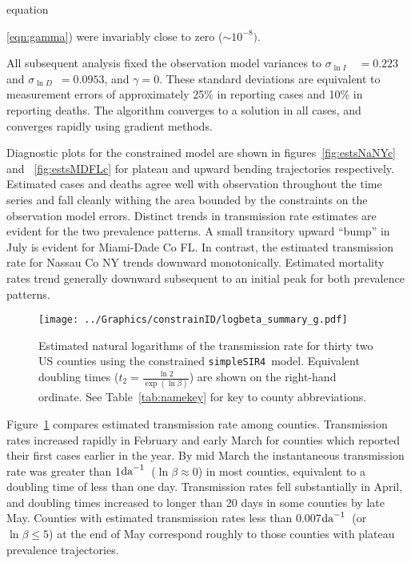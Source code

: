 \documentclass[12pt,letterpaper]{article}
\newcommand\perda{$\rm{da}^{-1}$}
\newcommand\SSm{{\tt simpleSIR4}}
\newcommand\slI{$\sigma_{\ln I}$\ }
\newcommand\slD{$\sigma_{\ln D}$}
\begin{document}
equation~{\ref{eqn:gamma}) were invariably close to 
zero ($\sim 10^{-8})$.

All subsequent analysis fixed the observation model variances to
\slI~$ = 0.223$ and \slD~$= 0.0953$, and $\gamma = 0$.
These standard deviations are equivalent to measurement errors of
approximately 25\% in reporting cases and 10\% in reporting deaths.
The algorithm converges to a solution in all cases, and converges
rapidly using gradient methods.

Diagnostic plots for the constrained model are shown in
figures~\ref{fig:estsNaNYc} and~ \ref{fig:estsMDFLc}
for plateau and upward  bending trajectories respectively.
Estimated cases and deaths agree well with observation throughout the
time series and fall cleanly withing the area bounded by the
constraints on the observation model errors.
Distinct trends in transmission rate estimates are evident for
the two prevalence patterns. A small transitory upward ``bump'' in July is
evident for Miami-Dade Co FL.
In contrast, the estimated transmission rate for Nassau Co NY trends
downward monotonically. 
Estimated mortality rates trend generally downward subsequent to an
initial peak for both prevalence patterns.

\begin{figure}[!h]
\begin{center}
\texttt{[image: ../Graphics/constrainID/logbeta\_summary\_g.pdf]}\\
\end{center}
\caption{\label{fig:xrates}
Estimated natural logarithms of the transmission rate for thirty two US
counties using the constrained \SSm\ model.
Equivalent doubling times ($t_2 = \frac{\ln 2}{\exp(\ln \beta)}$)
are shown on the right-hand ordinate.
See Table~\ref{tab:namekey} for key to county abbreviations.
}
\end{figure}

Figure~\ref{fig:xrates} compares estimated transmission rate among
counties.
Transmission rates increased rapidly in February and early March for
counties which reported their first cases earlier in the year.
By mid March the instantaneous transmission rate
was greater than 1\perda\ ($\ln \beta \approx 0$) in most counties,
equivalent to a doubling time of less than one day.
Transmission rates fell substantially in April, and doubling times
increased to longer than 20 days in some counties by late May.
Counties with estimated transmission rates less than 0.007\perda\ 
(or $\ln \beta \le 5$) at the end of May
correspond roughly to those counties with plateau prevalence
trajectories.

}
\end{document}

